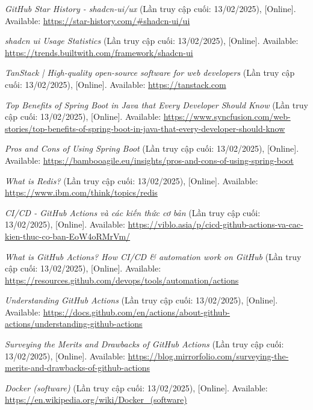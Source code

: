 \documentclass[12pt, a4paper]{article}
\begin{document}
\begin{thebibliography}{}
 \textit{GitHub Star History - shadcn-ui/ux} (Lần truy cập cuối: 13/02/2025), [Online]. Available: \url{https://star-history.com/#shadcn-ui/ui}

 \textit{shadcn ui Usage Statistics} (Lần truy cập cuối: 13/02/2025), [Online]. Available: \url{https://trends.builtwith.com/framework/shadcn-ui}

 \textit{TanStack | High-quality open-source software for web developers} (Lần truy cập cuối: 13/02/2025), [Online]. Available: \url{https://tanstack.com}

 \textit{Top Benefits of Spring Boot in Java that Every Developer Should Know} (Lần truy cập cuối: 13/02/2025), [Online]. Available: \url{https://www.syncfusion.com/web-stories/top-benefits-of-spring-boot-in-java-that-every-developer-should-know}

 \textit{Pros and Cons of Using Spring Boot} (Lần truy cập cuối: 13/02/2025), [Online]. Available: \url{https://bambooagile.eu/insights/pros-and-cons-of-using-spring-boot}

 \textit{What is Redis?} (Lần truy cập cuối: 13/02/2025), [Online]. Available: \url{https://www.ibm.com/think/topics/redis}


 \textit{CI/CD - GitHub Actions và các kiến thức cơ bản} (Lần truy cập cuối: 13/02/2025), [Online]. Available: \url{https://viblo.asia/p/cicd-github-actions-va-cac-kien-thuc-co-ban-EoW4oRMrVm/}


 \textit{What is GitHub Actions? How CI/CD \& automation work on GitHub} (Lần truy cập cuối: 13/02/2025), [Online]. Available: \url{https://resources.github.com/devops/tools/automation/actions}

 \textit{Understanding GitHub Actions} (Lần truy cập cuối: 13/02/2025), [Online]. Available: \url{https://docs.github.com/en/actions/about-github-actions/understanding-github-actions}

 \textit{Surveying the Merits and Drawbacks of GitHub Actions} (Lần truy cập cuối: 13/02/2025), [Online]. Available: \url{https://blog.mirrorfolio.com/surveying-the-merits-and-drawbacks-of-github-actions}

 \textit{Docker (software)} (Lần truy cập cuối: 13/02/2025), [Online]. Available: \url{https://en.wikipedia.org/wiki/Docker\_(software)}


\end{thebibliography}
\end{document}
